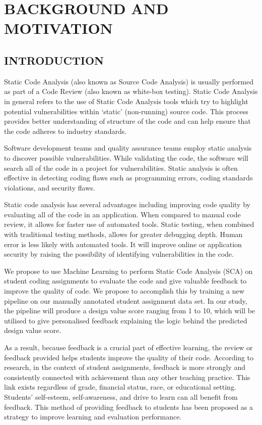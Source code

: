 
\chapter{BACKGROUND AND MOTIVATION} %
%

\section{INTRODUCTION} %
Static Code Analysis (also known as Source Code Analysis) is
usually performed as part of a Code Review (also known as
white-box testing). Static Code Analysis in general refers to
the use of Static Code Analysis tools which try to highlight
potential vulnerabilities within `static' (non-running)
source code. This process provides better understanding of
structure of the code and can help ensure that the code
adheres to industry standards.

Software development teams and quality assurance teams employ
static analysis to discover possible vulnerabilities.  While
validating the code, the software will search all of the code
in a project for vulnerabilities. Static analysis is often
effective in detecting coding flaws such as programming
errors, coding standards violations, and security flaws.

Static code analysis has several advantages including
improving code quality by evaluating all of the code in an
application. When compared to manual code review, it allows
for faster use of automated tools. Static testing, when
combined with traditional testing methods, allows for greater
debugging depth. Human error is less likely with automated
tools. It will improve online or application security by
raising the possibility of identifying vulnerabilities in the
code.

We propose to use Machine Learning to perform Static Code
Analysis (SCA) on student coding assignments to evaluate the
code and give valuable feedback to improve the quality of
code. We propose to accomplish this by training a new
pipeline on our manually annotated student assignment data
set. In our study, the pipeline will produce a design value
score ranging from 1 to 10, which will be utilised to give
personalised feedback explaining the logic behind the
predicted design value score.

As a result, because feedback is a crucial part of effective
learning, the review or feedback provided helps students
improve the quality of their code. According to research, in
the context of student assignments, feedback is more strongly
and consistently connected with achievement than any other
teaching practice. This link exists regardless of grade,
financial status, race, or educational setting. Students'
self-esteem, self-awareness, and drive to learn can all
benefit from feedback. This method of providing feedback to
students has been proposed as a strategy to improve learning
and evaluation performance.

